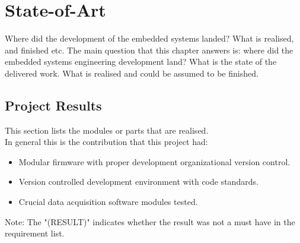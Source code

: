 \chapter{State-of-Art}
\label{chapter:conc}
Where did the development of the embedded systems landed? What is realised, and finished etc. 
The main question that this chapter answers is: where did the embedded systems engineering development land? What is the state of the delivered work. What is realised and could be assumed to be finished.
\section{Project Results}
This section lists the modules or parts that are realised. \\
In general this is the contribution that this project had:\\
\begin{itemize}
    \item Modular firmware with proper development organizational version control.
    \item Version controlled development environment with code standards.
    \item Crucial data acquisition software modules tested.
\end{itemize}
Note: The "(RESULT)" indicates whether the result was not a must have in the requirement list.
